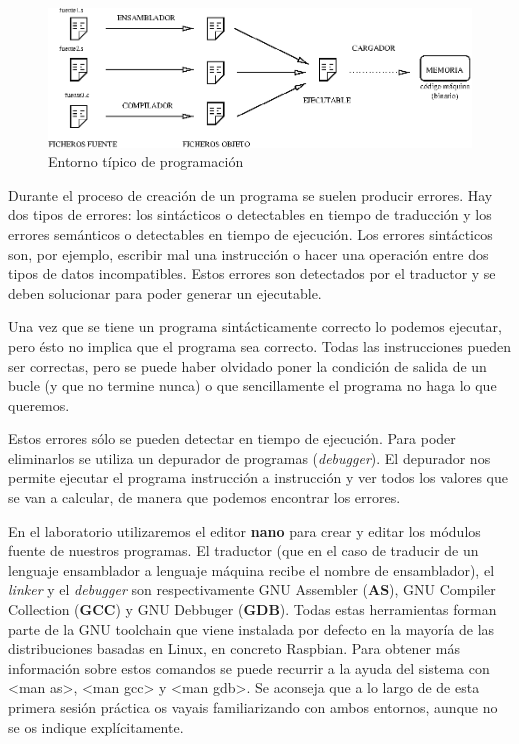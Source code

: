 \begin{figure}[h]
  \centering
    \includegraphics[width=13cm]{graphs/ensamblado.eps}
  \caption{Entorno típico de programación}
  \label{fig:entorno}
\end{figure}

Durante el proceso de creación de un programa se suelen producir errores.
Hay dos tipos de errores: los sintácticos o detectables en tiempo de
traducción y los errores semánticos o detectables en tiempo de ejecución.
Los errores sintácticos son, por ejemplo, escribir mal una instrucción o
hacer una operación entre dos tipos de datos incompatibles.
Estos errores son detectados por el traductor y se deben solucionar para
poder generar un ejecutable.

Una vez que se tiene un programa sintácticamente correcto lo podemos
ejecutar, pero ésto no implica que el programa sea correcto. Todas las
instrucciones pueden ser correctas, pero se puede haber olvidado poner la
condición de salida de un bucle (y que no termine nunca) o que
sencillamente el programa no haga lo que queremos.

Estos errores sólo se pueden detectar en tiempo de ejecución.
Para poder eliminarlos se utiliza un depurador de programas ({\it debugger}).
El depurador nos permite ejecutar el programa instrucción a instrucción y
ver todos los valores que se van a calcular, de manera que podemos encontrar
los errores.

En el laboratorio utilizaremos el editor {\bf nano} para crear
y editar los módulos fuente de nuestros programas. El traductor
(que en el caso de traducir de un lenguaje ensamblador a lenguaje máquina
recibe el nombre de ensamblador), el {\it linker} y el {\it debugger} son
respectivamente GNU Assembler ({\bf AS}), GNU Compiler Collection ({\bf GCC})
y GNU Debbuger ({\bf GDB}). Todas estas herramientas forman parte de la
GNU toolchain que viene instalada por defecto en la mayoría de las distribuciones
basadas en Linux, en concreto Raspbian. Para obtener más información sobre estos
comandos se puede recurrir a la ayuda del sistema con <man as>, <man gcc> y
<man gdb>. Se aconseja que a lo largo de de esta
primera sesión práctica os vayais familiarizando con ambos entornos,
aunque no se os indique explícitamente.

